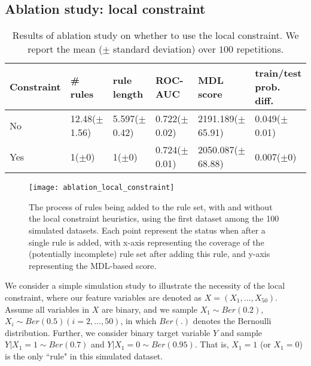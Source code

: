 
\subsection{Ablation study: local constraint}
\begin{table}[ht]
\small
\centering
\begin{tabular}{llllll}
  \hline
Constraint & \# rules & rule length & ROC-AUC & MDL score & train/test prob. diff. \\ 
  \hline
No & 12.48($\pm$1.56) & 5.597($\pm$0.42) & 0.722($\pm$0.02) & 2191.189($\pm$65.91) & 0.049($\pm$0.01) \\ 
  Yes & 1($\pm$0) & 1($\pm$0) & 0.724($\pm$0.01) & 2050.087($\pm$68.88) & 0.007($\pm$0) \\ 
   \hline\end{tabular}
\caption{Results of ablation study on whether to use the local constraint. We report the mean ($\pm$ standard deviation) over $100$ repetitions. } \label{table:ablation_simu}
\end{table}
\begin{figure}[ht]
	\texttt{[image: ablation\_local\_constraint]}
	\caption{The process of rules being added to the rule set, with and without the local constraint heuristics, using the first  dataset among the 100 simulated datasets. Each point represent the status when after a single rule is added, with x-axis representing the coverage of the (potentially incomplete) rule set after adding this rule, and y-axis representing the MDL-based score. } \label{fig:ablation_simulation}
\end{figure}
We consider a simple simulation study to illustrate the necessity of the local constraint, where our feature variables are denoted as $X = (X_1, ..., X_{50})$. Assume all variables in $X$ are binary, and we sample $X_1 \sim Ber(0.2)$, $X_i \sim Ber(0.5) (i = 2, ..., 50)$, in which $Ber(.)$ denotes the Bernoulli distribution. Further, we consider binary target variable $Y$ and sample $Y|X_1 = 1 \sim Ber(0.7)$ and $Y|X_1 = 0 \sim Ber(0.95)$. That is, $X_1 = 1$ (or $X_1 = 0$) is the only ``rule" in this simulated dataset. 

